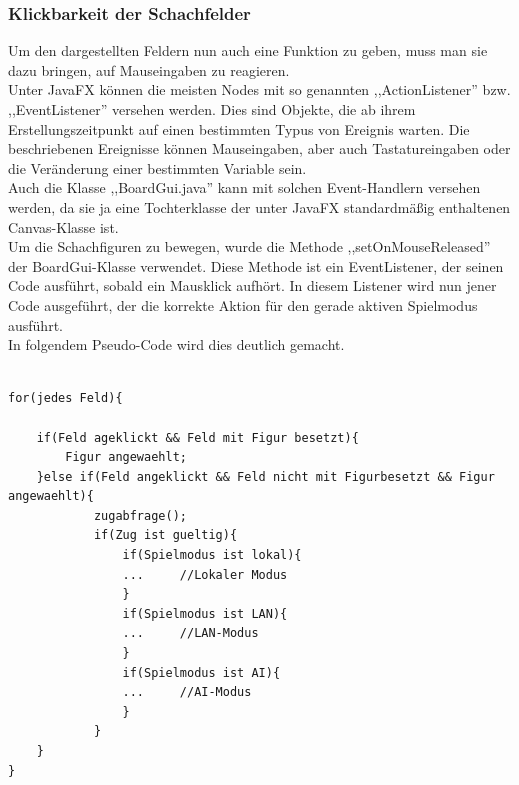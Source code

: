 \documentclass[12pt,a4paper]{article}
\begin{document}
\newpage

\subsubsection{Klickbarkeit der Schachfelder}
\label{SUBSUBSECTION:CLICKABLE}
Um den dargestellten Feldern nun auch eine Funktion zu geben, muss man sie dazu bringen, auf Mauseingaben zu reagieren. \\
Unter JavaFX können die meisten Nodes mit so genannten ,,ActionListener'' bzw. ,,EventListener'' versehen werden. Dies sind Objekte, die ab ihrem Erstellungszeitpunkt auf einen bestimmten Typus von Ereignis warten. Die beschriebenen Ereignisse können Mauseingaben, aber auch Tastatureingaben oder die Veränderung einer bestimmten Variable sein. \\
Auch die Klasse ,,BoardGui.java'' kann mit solchen Event-Handlern versehen werden, da sie ja eine Tochterklasse der unter JavaFX standardmäßig enthaltenen Canvas-Klasse ist.\\
Um die Schachfiguren zu bewegen, wurde die Methode ,,setOnMouseReleased'' der BoardGui-Klasse verwendet. Diese Methode ist ein EventListener, der seinen Code ausführt, sobald ein Mausklick aufhört.
In diesem Listener wird nun jener Code ausgeführt, der die korrekte Aktion für den gerade aktiven Spielmodus ausführt. \\
In folgendem Pseudo-Code wird dies deutlich gemacht.

\lstset{language=java}
\begin{lstlisting}

for(jedes Feld){

	if(Feld ageklickt && Feld mit Figur besetzt){
		Figur angewaehlt;
	}else if(Feld angeklickt && Feld nicht mit Figurbesetzt && Figur angewaehlt){
			zugabfrage();
			if(Zug ist gueltig){
				if(Spielmodus ist lokal){
				... 	//Lokaler Modus
				}
				if(Spielmodus ist LAN){
				...		//LAN-Modus
				}
				if(Spielmodus ist AI){
				...		//AI-Modus
				}
			}	
	}
}

\end{lstlisting}
\end{document}
